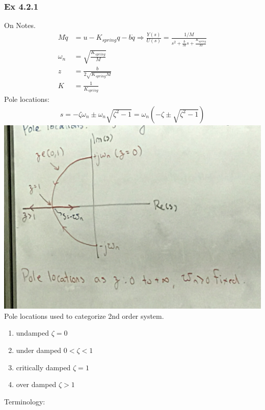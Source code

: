 \documentclass[letterpaper]{article}
\begin{document}
	\subsubsection*{Ex 4.2.1}
	On Notes.
	\begin{align*}
		M\ddot q & =u-K_{spring}q-b\dot q\Rightarrow \frac{Y(s)}{U(s)}=\frac{1/M}{s^2+\frac{b}{M}s+\frac{K_{spring}}{M}} \\
		\omega_n & =\sqrt{\frac{K_{spring}}{M}}                                                                          \\
		z        & =\frac{b}{2\sqrt{K_{spring}M}}                                                                        \\
		K        & =\frac{1}{K_{spring}}                                                                                 
	\end{align*}
	Pole locations:
	\begin{align*}
		s=-\zeta\omega_n\pm \omega_n\sqrt{\zeta^2-1}=\omega_n(-\zeta\pm \sqrt{\zeta^2-1}) 
	\end{align*}
	\includegraphics[scale=0.1]{images/4_2_POLE_LOCATION.jpg}\\
	Pole locations used to categorize 2nd order system.
	\begin{enumerate}
		\item undamped $\zeta=0$
		\item under damped $0<\zeta<1$
		\item critically damped $\zeta =1$
		\item over damped $\zeta>1$
	\end{enumerate}
	Terminology: \\
\end{document}
